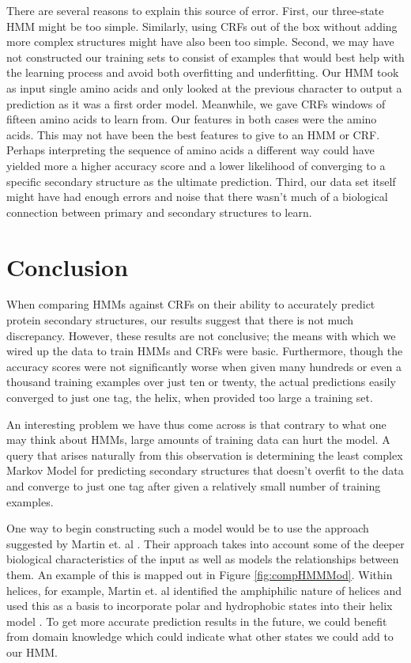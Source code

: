 \documentclass[11 pt, twocolumn]{article}
\begin{document}
There are several reasons to explain this source of error. First, our three-state HMM might be too simple. Similarly, using CRFs out of the box without adding more complex structures might have also been too simple. Second, we may have not constructed our training sets to consist of examples that would best help with the learning process and avoid both overfitting and underfitting. Our HMM took as input single amino acids and only looked at the previous character to output a prediction as it was a first order model. Meanwhile, we gave CRFs windows of fifteen amino acids to learn from. Our features in both cases were the amino acids. This may not have been the best features to give to an HMM or CRF. Perhaps interpreting the sequence of amino acids a different way could have yielded more a higher accuracy score and a lower likelihood of converging to a specific secondary structure as the ultimate prediction. Third, our data set itself might have had enough errors and noise that there wasn't much of a biological connection between primary and secondary structures to learn. 

\section{Conclusion}

When comparing  HMMs against CRFs on  their ability to accurately predict protein secondary structures, our results suggest  that there is not much discrepancy. However, these results are not conclusive; the means with which we  wired up the data to train HMMs and CRFs were  basic. Furthermore, though the accuracy scores were not significantly worse  when given many hundreds or even a thousand training examples over just ten or twenty, the actual predictions easily converged to just one tag, the helix, when provided too large a training set. 

An interesting problem we have thus come across is that contrary to what one may think about HMMs, large amounts of training data can hurt the model. A query that arises naturally from this observation is determining the least complex Markov Model  for predicting secondary structures that doesn't overfit  to the data and converge to just one tag after given a relatively small number of training examples. 

One way to begin constructing such a model would be to use the approach suggested by Martin et. al \cite{Martin}. Their approach takes into account some of the deeper biological characteristics of the input as well as models the relationships between them. An example of this is mapped out in Figure \ref{fig:compHMMMod}. Within helices, for example, Martin et. al identified the amphiphilic nature of helices and used this as a basis to incorporate polar and hydrophobic states into their helix model \cite{Martin}. To get more accurate prediction results in the future, we could benefit from domain knowledge which could indicate what other states we could add to our HMM.
\end{document}
